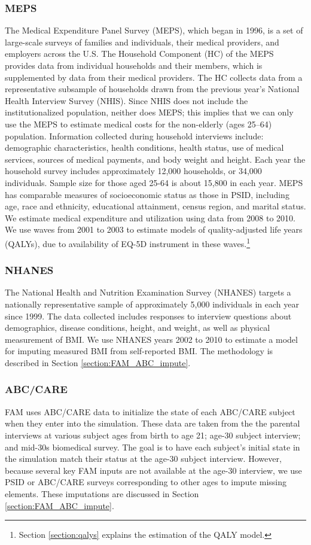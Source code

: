 \subsubsection{MEPS}
\noindent The Medical Expenditure Panel Survey (MEPS), which began in 1996, is a set of large-scale surveys of families and individuals, their medical providers, and employers across the U.S. The Household Component (HC) of the MEPS provides data from
individual households and their members, which is supplemented by data from their medical providers.
The HC collects data from a representative subsample of households drawn from the
previous year's National Health Interview Survey (NHIS). Since NHIS does not include the
institutionalized population, neither does MEPS; this implies that we can only use the MEPS to
estimate medical costs for the non-elderly (ages 25--64) population. Information collected during household
interviews include: demographic characteristics, health conditions, health status, use of medical
services, sources of medical payments, and body weight and height. Each year the household survey
includes approximately 12,000 households, or 34,000 individuals. Sample size for those aged 25-64 is
about 15,800 in each year. MEPS has comparable measures of socioeconomic status as those in PSID,
including age, race and ethnicity, educational attainment, census region, and marital status. We estimate medical expenditure
and utilization using data from 2008 to 2010. We use waves from 2001 to 2003 to estimate models of quality-adjusted life years (QALYs), due to availability of EQ-5D instrument in these waves.\footnote{Section \ref{section:qalys} explains the estimation of the QALY model.}


\subsubsection{NHANES}
\noindent
The National Health and Nutrition Examination Survey (NHANES) targets a nationally representative sample of approximately 5,000 individuals in each year since 1999. The data collected includes responses to interview questions about demographics, disease conditions, height, and weight, as well as physical measurement of BMI. We use NHANES years 2002 to 2010 to estimate a model for imputing measured BMI from self-reported BMI. The methodology is described in Section \ref{section:FAM_ABC_impute}.

\subsubsection{ABC/CARE}
\noindent FAM uses ABC/CARE data to initialize the state of each ABC/CARE subject when they enter into the simulation.
These data are taken from the the parental interviews at various subject ages from birth to age 21; age-30 subject interview; and mid-30s biomedical survey.
The goal is to have each subject's initial state in the simulation match their status at the age-30 subject interview. However, because several key FAM inputs are not available at the age-30 interview, we use PSID or ABC/CARE surveys corresponding to other ages to impute missing elements. These imputations are discussed in Section \ref{section:FAM_ABC_impute}.

